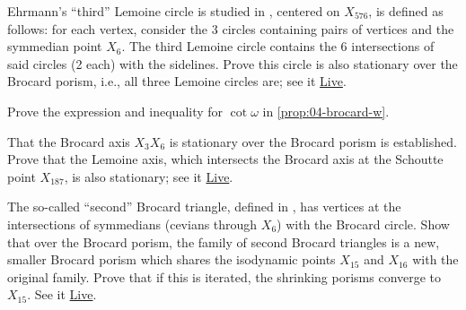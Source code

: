 \begin{exercise}
Ehrmann's ``third'' Lemoine circle is studied in \cite{darij2012-ehrmann}, centered on $X_{576}$, is defined as follows: for each vertex, consider the 3 circles containing pairs of vertices and the symmedian point $X_6$. The third Lemoine circle contains the 6 intersections of said circles (2 each) with the sidelines. Prove this circle is also stationary over the Brocard porism, i.e., all three Lemoine circles are; see it \href{https://bit.ly/3tw09gA}{Live}. 
\end{exercise}


\begin{exercise}
Prove the expression and inequality for $\cot{\omega}$ in \cref{prop:04-brocard-w}.
\end{exercise}

\begin{exercise}
That the Brocard axis $X_3 X_6$ is stationary over the Brocard porism is established. Prove that the Lemoine axis, which intersects the Brocard axis at the Schoutte point $X_{187}$, is also stationary; see it \href{https://bit.ly/3nTRi75}{Live}.
\end{exercise}

\begin{exercise}
The so-called ``second'' Brocard triangle, defined in \cite[Second Brocard Triangle]{mw}, has vertices at the intersections of symmedians (cevians through $X_6$) with the Brocard circle. Show that over the Brocard porism, the family of second Brocard triangles is a new, smaller Brocard porism which shares the isodynamic points $X_{15}$ and $X_{16}$ with the original family. Prove that if this is iterated, the shrinking porisms converge to $X_{15}$. See it \href{https://bit.ly/3ttMNBg}{Live}.
\end{exercise}

